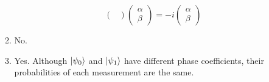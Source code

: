 \documentclass[12pt]{article}
\begin{document}
\begin{enumerate}[font=\bfseries]
\begin{enumerate}
\[\begin{pmatrix}
                \end{pmatrix} 
                 \begin{pmatrix} 
                \alpha \\ \beta
                \end{pmatrix} 
                =
                -i
                \begin{pmatrix} 
                \alpha \\ \beta
                \end{pmatrix} 
                \]
        \item No.
        \item Yes. Although $\ket{\psi_0}$ and $\ket{\psi_1}$ have different phase coefficients, their probabilities of each measurement are the same.
    \end{enumerate}
    

\end{enumerate}
\end{document}
